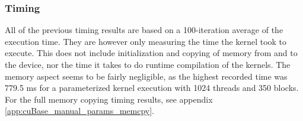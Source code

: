 \begin{table}[h!]
\centering
{}
\caption{Number of unequal results with various error tolerances. 32 = single precision, 64 = double precision \label{table:errorComparison}}
\end{table}

\subsubsection{Timing}
All of the previous timing results are based on a 100-iteration average of the execution time.
They are however only measuring the time the kernel took to execute.
This does not include initialization and copying of memory from and to the device, nor the time it takes to do runtime compilation of the kernels.
The memory aspect seems to be fairly negligible, as the highest recorded time was 779.5 ms for a parameterized kernel execution with 1024 threads and 350 blocks.
For the full memory copying timing results, see appendix \ref{app:cuBase_manual_params_memcpy}.

